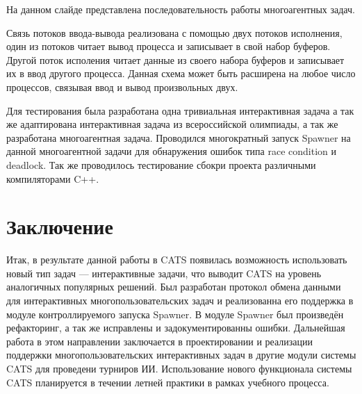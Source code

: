 \documentclass[a4paper,14pt]{extarticle}
\begin{document}
На данном слайде представлена последовательность работы многоагентных задач.

Связь потоков ввода-вывода реализована с помощью двух потоков исполнения, один из потоков читает вывод процесса и записывает в свой набор буферов. Другой поток исполения читает данные из своего набора буферов и записывает их в ввод другого процесса. Данная схема может быть расширена на любое число процессов, связывая ввод и вывод произвольных двух.

Для тестирования была разработана одна тривиальная интерактивная задача а так же адаптирована интерактивная задача из всероссийской олимпиады, а так же разработана многоагентная задача. Проводился многократный запуск Spawner на данной многоагентной задачи для обнаружения ошибок типа race condition и deadlock. Так же проводилось тестирование сбокри проекта различными компиляторами C++.

\section{Заключение}

Итак, в результате данной работы в CATS появилась возможность использовать новый тип задач --- интерактивные задачи, что выводит CATS на уровень аналогичных популярных решений. Был разработан протокол обмена данными для интерактивных многопользовательских задач и реализованна его поддержка в модуле контроллируемого запуска Spawner. В модуле Spawner был произведён рефакторинг, а так же исправлены и задокументированны ошибки. Дальнейшая работа в этом направлении заключается в проектировании и реализации поддержки многопользовательских интерактивных задач в другие модули системы CATS для проведени турниров ИИ. Использование нового функционала системы CATS планируется в течении летней практики в рамках учебного процесса.
\end{document}
